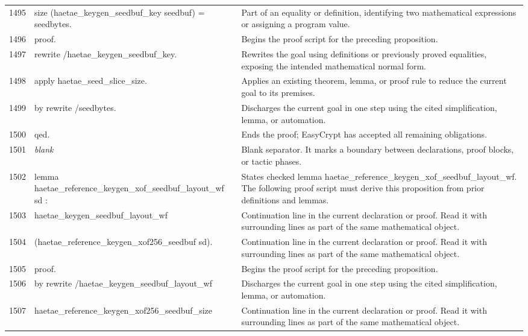 \documentclass[10pt]{article}
\begin{document}
\begin{longtable}{r L{0.53\textwidth} L{0.37\textwidth}}
1495 & {\ttfamily\scriptsize   size (haetae\_keygen\_seedbuf\_key seedbuf) = seedbytes.} & Part of an equality or definition, identifying two mathematical expressions or assigning a program value. \\
1496 & {\ttfamily\scriptsize proof.} & Begins the proof script for the preceding proposition. \\
1497 & {\ttfamily\scriptsize rewrite /haetae\_keygen\_seedbuf\_key.} & Rewrites the goal using definitions or previously proved equalities, exposing the intended mathematical normal form. \\
1498 & {\ttfamily\scriptsize apply haetae\_seed\_slice\_size.} & Applies an existing theorem, lemma, or proof rule to reduce the current goal to its premises. \\
1499 & {\ttfamily\scriptsize by rewrite /seedbytes.} & Discharges the current goal in one step using the cited simplification, lemma, or automation. \\
1500 & {\ttfamily\scriptsize qed.} & Ends the proof; EasyCrypt has accepted all remaining obligations. \\
1501 & {\ttfamily\scriptsize \emph{blank}} & Blank separator.  It marks a boundary between declarations, proof blocks, or tactic phases. \\
1502 & {\ttfamily\scriptsize lemma haetae\_reference\_keygen\_xof\_seedbuf\_layout\_wf sd :} & States checked lemma haetae\_reference\_keygen\_xof\_seedbuf\_layout\_wf.  The following proof script must derive this proposition from prior definitions and lemmas. \\
1503 & {\ttfamily\scriptsize   haetae\_keygen\_seedbuf\_layout\_wf} & Continuation line in the current declaration or proof.  Read it with surrounding lines as part of the same mathematical object. \\
1504 & {\ttfamily\scriptsize     (haetae\_reference\_keygen\_xof256\_seedbuf sd).} & Continuation line in the current declaration or proof.  Read it with surrounding lines as part of the same mathematical object. \\
1505 & {\ttfamily\scriptsize proof.} & Begins the proof script for the preceding proposition. \\
1506 & {\ttfamily\scriptsize by rewrite /haetae\_keygen\_seedbuf\_layout\_wf} & Discharges the current goal in one step using the cited simplification, lemma, or automation. \\
1507 & {\ttfamily\scriptsize            haetae\_reference\_keygen\_xof256\_seedbuf\_size} & Continuation line in the current declaration or proof.  Read it with surrounding lines as part of the same mathematical object. \\

\end{longtable}
\end{document}
